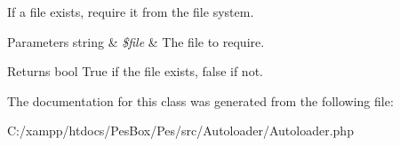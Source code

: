 If a file exists, require it from the file system.


\begin{DoxyParams}[1]{Parameters}
string & {\em \$file} & The file to require. \\
\hline
\end{DoxyParams}
\begin{DoxyReturn}{Returns}
bool True if the file exists, false if not. 
\end{DoxyReturn}


The documentation for this class was generated from the following file\+:\begin{DoxyCompactItemize}
\item 
C\+:/xampp/htdocs/\+Pes\+Box/\+Pes/src/\+Autoloader/Autoloader.\+php\end{DoxyCompactItemize}
